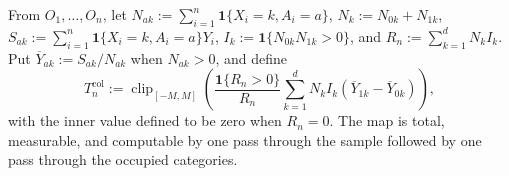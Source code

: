 From \(O_1,\ldots,O_n\), let \(N_{ak}:=\sum_{i=1}^n\mathbf 1\{X_i=k,A_i=a\}\), \(N_k:=N_{0k}+N_{1k}\), \(S_{ak}:=\sum_{i=1}^n\mathbf 1\{X_i=k,A_i=a\}Y_i\), \(I_k:=\mathbf 1\{N_{0k}N_{1k}>0\}\), and \(R_n:=\sum_{k=1}^dN_kI_k\).  Put \(\overline Y_{ak}:=S_{ak}/N_{ak}\) when \(N_{ak}>0\), and define
\[
 T_n^{\mathrm{col}}:=\operatorname{clip}_{[-M,M]}\!\left(
 \frac{\mathbf 1\{R_n>0\}}{R_n}
 \sum_{k=1}^dN_kI_k(\overline Y_{1k}-\overline Y_{0k})
 \right),
\]
with the inner value defined to be zero when \(R_n=0\).  The map is total, measurable, and computable by one pass through the sample followed by one pass through the occupied categories.